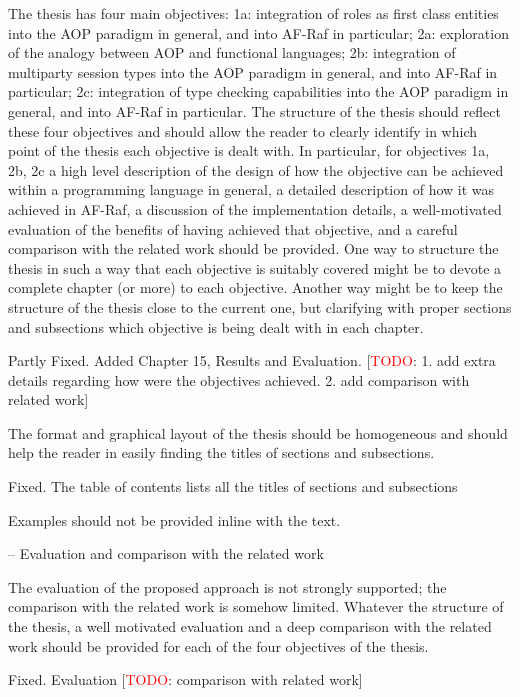 \documentclass{article}
\newcommand{\todo}[1]{[\textcolor{red}{TODO}: #1]}
\newenvironment{them}{\noindent\begingroup\color{blue}}{\endgroup\par}
\begin{document}
\begin{them}

The thesis has four main objectives: 1a: integration of roles as first class
entities into the AOP paradigm in general, and into AF-Raf in particular; 2a:
exploration of the analogy between AOP and functional languages; 2b:
integration of multiparty session types into the AOP paradigm in general, and
into AF-Raf in particular; 2c: integration of type checking capabilities into
the AOP paradigm in general, and into AF-Raf in particular.  The structure of
the thesis should reflect these four objectives and should allow the reader to
clearly identify in which point of the thesis each objective is dealt with. In
particular, for objectives 1a, 2b, 2c a high level description of the design of
how the objective can be achieved within a programming language in general, a
detailed description of how it was achieved in AF-Raf, a discussion of the
implementation details, a well-motivated evaluation of the benefits of having
achieved that objective, and a careful comparison with the related work should
be provided.  One way to structure the thesis in such a way that each objective
is suitably covered might be to devote a complete chapter (or more) to each
objective. Another way might be to keep the structure of the thesis close to
the current one, but clarifying with proper sections and subsections which
objective is being dealt with in each chapter.

\end{them}
Partly Fixed. Added Chapter 15, Results and Evaluation.
\todo{1. add extra details regarding how were the objectives achieved. 2. add comparison with related work}

\begin{them}

The format and graphical layout of the thesis should be homogeneous and should
help the reader in easily finding the titles of sections and subsections.

\end{them}
Fixed. The table of contents lists all the titles of sections and subsections

\begin{them}

 Examples should not be provided inline with the text.
\end{them}
\todo{I have no idea what you mean!}

\begin{them}

-- Evaluation and comparison with the related work

The evaluation of the proposed approach is not strongly supported; the
comparison with the related work is somehow limited. Whatever the structure of
the thesis, a well motivated evaluation and a deep comparison with the related
work should be provided for each of the four objectives of the thesis.

\end{them}
Fixed. Evaluation
\todo{comparison with related work}
\end{document}
